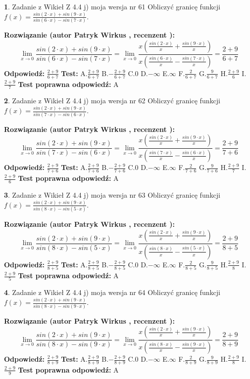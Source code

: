 \documentclass[12pt, a4paper]{article}
\theoremstyle{definition} %
\newtheorem{zad}{}
\newcommand{\zadStart}[1]{\begin{zad}#1\newline}
\newcommand{\zadStop}{\end{zad}}
\newcommand{\rozwStart}[2]{\noindent \textbf{Rozwiązanie (autor #1 , recenzent #2): }\newline}
\newcommand{\rozwStop}{\newline}
\newcommand{\odpStart}{\noindent \textbf{Odpowiedź:}\newline}
\newcommand{\odpStop}{\newline}
\newcommand{\testStart}{\noindent \textbf{Test:}\newline}
\newcommand{\testStop}{\newline}
\newcommand{\kluczStart}{\noindent \textbf{Test poprawna odpowiedź:}\newline}
\newcommand{\kluczStop}{\newline}
\begin{document}
\zadStart{Zadanie z Wikieł Z 4.4 j) moja wersja nr 61}
Obliczyć granicę funkcji $f(x)=\frac{sin(2\cdot x) +sin(9\cdot x)}{sin(6\cdot x) -sin(7\cdot x)}$.
\zadStop
\rozwStart{Patryk Wirkus}{}
$$\lim\limits_{x\to 0}\frac{sin(2\cdot x) +sin(9\cdot x)}{sin(6\cdot x) -sin(7\cdot x)}=\lim\limits_{x\to 0}\frac{x(\frac{sin(2\cdot x)}{x}+\frac{sin(9\cdot x)}{x})}{x(\frac{sin(6\cdot x)}{x}-\frac{sin(7\cdot x)}{x})}=\frac{2+9}{6+7}$$
\rozwStop
\odpStart
$\frac{2+9}{6+7}$
\odpStop
\testStart
A.$\frac{2+9}{6+7}$
B.$-\frac{2+9}{6+7}$
C.$0$
D.$-\infty$
E.$\infty$
F.$\frac{2}{6+7}$
G.$\frac{9}{6+7}$
H.$\frac{2+9}{6}$
I.$\frac{2+9}{7}$
\testStop
\kluczStart
A
\kluczStop



\zadStart{Zadanie z Wikieł Z 4.4 j) moja wersja nr 62}
Obliczyć granicę funkcji $f(x)=\frac{sin(2\cdot x) +sin(9\cdot x)}{sin(7\cdot x) -sin(6\cdot x)}$.
\zadStop
\rozwStart{Patryk Wirkus}{}
$$\lim\limits_{x\to 0}\frac{sin(2\cdot x) +sin(9\cdot x)}{sin(7\cdot x) -sin(6\cdot x)}=\lim\limits_{x\to 0}\frac{x(\frac{sin(2\cdot x)}{x}+\frac{sin(9\cdot x)}{x})}{x(\frac{sin(7\cdot x)}{x}-\frac{sin(6\cdot x)}{x})}=\frac{2+9}{7+6}$$
\rozwStop
\odpStart
$\frac{2+9}{7+6}$
\odpStop
\testStart
A.$\frac{2+9}{7+6}$
B.$-\frac{2+9}{7+6}$
C.$0$
D.$-\infty$
E.$\infty$
F.$\frac{2}{7+6}$
G.$\frac{9}{7+6}$
H.$\frac{2+9}{7}$
I.$\frac{2+9}{6}$
\testStop
\kluczStart
A
\kluczStop



\zadStart{Zadanie z Wikieł Z 4.4 j) moja wersja nr 63}
Obliczyć granicę funkcji $f(x)=\frac{sin(2\cdot x) +sin(9\cdot x)}{sin(8\cdot x) -sin(5\cdot x)}$.
\zadStop
\rozwStart{Patryk Wirkus}{}
$$\lim\limits_{x\to 0}\frac{sin(2\cdot x) +sin(9\cdot x)}{sin(8\cdot x) -sin(5\cdot x)}=\lim\limits_{x\to 0}\frac{x(\frac{sin(2\cdot x)}{x}+\frac{sin(9\cdot x)}{x})}{x(\frac{sin(8\cdot x)}{x}-\frac{sin(5\cdot x)}{x})}=\frac{2+9}{8+5}$$
\rozwStop
\odpStart
$\frac{2+9}{8+5}$
\odpStop
\testStart
A.$\frac{2+9}{8+5}$
B.$-\frac{2+9}{8+5}$
C.$0$
D.$-\infty$
E.$\infty$
F.$\frac{2}{8+5}$
G.$\frac{9}{8+5}$
H.$\frac{2+9}{8}$
I.$\frac{2+9}{5}$
\testStop
\kluczStart
A
\kluczStop



\zadStart{Zadanie z Wikieł Z 4.4 j) moja wersja nr 64}
Obliczyć granicę funkcji $f(x)=\frac{sin(2\cdot x) +sin(9\cdot x)}{sin(8\cdot x) -sin(9\cdot x)}$.
\zadStop
\rozwStart{Patryk Wirkus}{}
$$\lim\limits_{x\to 0}\frac{sin(2\cdot x) +sin(9\cdot x)}{sin(8\cdot x) -sin(9\cdot x)}=\lim\limits_{x\to 0}\frac{x(\frac{sin(2\cdot x)}{x}+\frac{sin(9\cdot x)}{x})}{x(\frac{sin(8\cdot x)}{x}-\frac{sin(9\cdot x)}{x})}=\frac{2+9}{8+9}$$
\rozwStop
\odpStart
$\frac{2+9}{8+9}$
\odpStop
\testStart
A.$\frac{2+9}{8+9}$
B.$-\frac{2+9}{8+9}$
C.$0$
D.$-\infty$
E.$\infty$
F.$\frac{2}{8+9}$
G.$\frac{9}{8+9}$
H.$\frac{2+9}{8}$
I.$\frac{2+9}{9}$
\testStop
\kluczStart
A
\kluczStop
\end{document}
